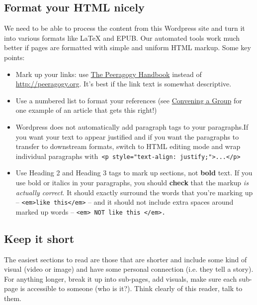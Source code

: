 \subsection{Format your HTML nicely}

We need to be able to process the content from this Wordpress site and
turn it into various formats like LaTeX and EPUB. Our automated tools
work much better if pages are formatted with simple and uniform HTML
markup. Some key points:

\begin{itemize}
\item
  Mark up your links: use \href{http://peeragogy.org}{The Peeragogy
  Handbook} instead of
  \href{http://peeragogy.org}{http://peeragogy.org}. It's best if the
  link text is somewhat descriptive.
\item
  Use a numbered list to format your references (see
  \href{http://peeragogy.org/convening-a-group/}{Convening a Group} for
  one example of an article that gets this right!)
\item
  Wordpress does not automatically add paragraph tags to your
  paragraphs.If you want your text to appear justified and if you want
  the paragraphs to transfer to downstream formats, switch to HTML
  editing mode and wrap individual paragraphs
  with\texttt{ \textless{}p style="text-align: justify;"\textgreater{}...\textless{}/p\textgreater{}}
\item
  Use Heading 2 and Heading 3 tags to mark up sections, not
  \textbf{bold} text. If you use bold or italics in your paragraphs, you
  should \textbf{check} that the markup \emph{is actually correct}. It
  should exactly surround the words that you're marking up --
  \texttt{\textless{}em\textgreater{}like this\textless{}/em\textgreater{}}
  -- and it should not include extra spaces around marked up words --
  \texttt{\textless{}em\textgreater{} NOT like this \textless{}/em\textgreater{}.}
\end{itemize}
\subsection{Keep it short}

The easiest sections to read are those that are shorter and include some
kind of visual (video or image) and have some personal connection (i.e.
they tell a story). For anything longer, break it up into sub-pages, add
visuals, make sure each sub-page is accessible to someone (who is it?).
Think clearly of this reader, talk to them.

